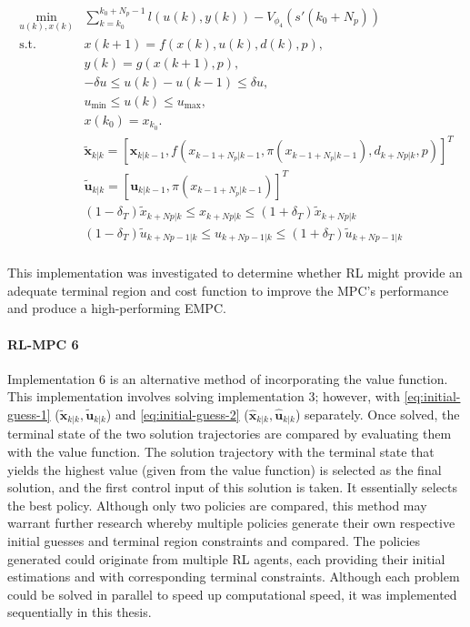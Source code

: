\begin{subequations} \label{eq:rl-mpc-ocp}
	\begin{align}
		\min_{u(k),x(k)} & \sum_{k = k_0}^{k_0 + N_p-1} {l(u(k), y(k))} - V_{\phi_4}(s'(k_0+N_p)) \\
		\text{s.t.} \quad & x(k+1) = f(x(k), u(k), d(k), p),  \label{eq:rl-mpc-dynamics-constraint} \\
		& y(k) = g(x(k+1), p), \label{eq:rl-mpc-output-constraint} \\
		& -\delta u \leq u(k) - u(k-1) \leq \delta u, \label{eq:rl-mpc-delta-u} \\
		& u_{\min} \leq u(k) \leq u_{\max}, \label{eq:rl-mpc-u-limits}\\
		& x(k_0) = x_{k_0}. \label{eq:rl-pmc-initial} \\
 		&\tilde{\mathbf{x}}_{k|k} = [\mathbf{x}_{k|k-1},f(x_{k-1 + N_p|k-1}, \pi(x_{k-1 + N_p|k-1}), d_{k+Np|k},p)]^T\\ 
		&\tilde{\mathbf{u}}_{k|k} = [\mathbf{u}_{k|k-1},\pi(x_{k-1 + N_p|k-1})]^T\\
		& (1-\delta_T)\tilde{x}_{k+Np|k} \leq x_{k+Np|k} \leq (1+\delta_T)\tilde{x}_{k+Np|k}\\
		&(1-\delta_T)\tilde{u}_{k+Np-1|k} \leq u_{k+Np-1|k} \leq (1+\delta_T) \tilde{u}_{k+Np-1|k}\\
	\end{align}
\end{subequations}

This implementation was investigated to determine whether RL might provide an adequate terminal region and cost function to improve the MPC's performance and produce a high-performing EMPC. 


\paragraph{RL-MPC 6}
Implementation 6 is an alternative method of incorporating the value function. This implementation involves solving implementation 3; however, with \autoref{eq:initial-guess-1} ($\tilde{\mathbf{x}}_{k|k},\tilde{\mathbf{u}}_{k|k}$) and \autoref{eq:initial-guess-2} ($\hat{\mathbf{x}}_{k|k},\hat{\mathbf{u}}_{k|k}$) separately. Once solved, the terminal state of the two solution trajectories are compared by evaluating them with the value function. The solution trajectory with the terminal state that yields the highest value (given from the value function) is selected as the final solution, and the first control input of this solution is taken. It essentially selects the best policy. Although only two policies are compared, this method may warrant further research whereby multiple policies generate their own respective initial guesses and terminal region constraints and compared. The policies generated could originate from multiple RL agents, each providing their initial estimations and with corresponding terminal constraints. Although each problem could be solved in parallel to speed up computational speed, it was implemented sequentially in this thesis.




